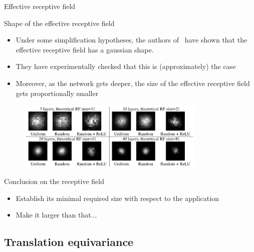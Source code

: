 \documentclass[xcolor=pdftex,dvipsnames,table,mathserif]{beamer}
\begin{document}
\begin{frame}{Effective receptive field}

\begin{block}{Shape of the effective receptive field}
\begin{itemize}
\item   Under some simplification hypotheses, the authors of~\cite{luo_understanding_2017} have shown that the effective receptive field has a gaussian shape.
  \item They have experimentally checked that this is (approximately) the case
  \item Moreover, as the network gets deeper, the size of the effective receptive field gets proportionally smaller
\end{itemize}

\end{block}

  \begin{figure}
    \includegraphics[width=0.8\textwidth]{effective_receptive_field.png}
  \end{figure}



\end{frame}


\begin{frame}{Conclusion on the receptive field}

\begin{itemize}
\item Establish its minimal required size with respect to the application
\item Make it larger than that...
\end{itemize}

\end{frame}


\subsection{Translation equivariance}
\end{document}
